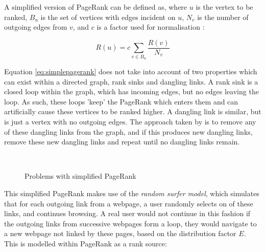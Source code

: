 A simplified version of PageRank can be defined as, where $u$ is the vertex to be ranked, $B_u$ is the set of vertices with edges incident on $u$, $N_v$ is the number of outgoing edges from $v$, and $c$ is a factor used for normalisation \cite{pagerank}:

\begin{equation}
R(u) = c \sum_{v \in B_u} \frac{R(v)}{N_v}
\label{eq:simplepagerank}
\end{equation}

Equation \ref{eq:simplepagerank} does not take into account of two properties which can exist within a directed graph, rank sinks and dangling links. A rank sink is a closed loop within the graph, which has incoming edges, but no edges leaving the loop. As such, these loops 'keep' the PageRank which enters them and can artificially cause these vertices to be ranked higher. A dangling link is similar, but is just a vertex with no outgoing edges. The approach taken by \citeauthor{pagerank} is to remove any of these dangling links from the graph, and if this produces new dangling links, remove these new dangling links and repeat until no dangling links remain.

\begin{figure}
  \centering
  ~ 
  ~ 
  
  \caption{Problems with simplified PageRank}
  \label{fig:pagerank}
\end{figure}

This simplified PageRank makes use of the \emph{random surfer model}, which simulates that for each outgoing link from a webpage, a user randomly selects on of these links, and continues browsing. A real user would not continue in this fashion if the outgoing links from successive webpages form a loop, they would navigate to a new webpage not linked by these pages, based on the distribution factor $E$. This is modelled within PageRank as a rank source:

